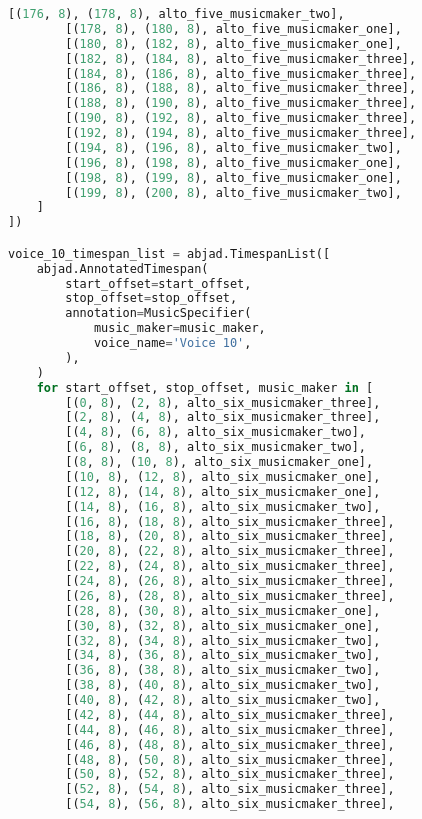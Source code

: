 \begin{lstlisting}[language=Python, caption=Invocation Source Code]
        [(176, 8), (178, 8), alto_five_musicmaker_two],
        [(178, 8), (180, 8), alto_five_musicmaker_one],
        [(180, 8), (182, 8), alto_five_musicmaker_one],
        [(182, 8), (184, 8), alto_five_musicmaker_three],
        [(184, 8), (186, 8), alto_five_musicmaker_three],
        [(186, 8), (188, 8), alto_five_musicmaker_three],
        [(188, 8), (190, 8), alto_five_musicmaker_three],
        [(190, 8), (192, 8), alto_five_musicmaker_three],
        [(192, 8), (194, 8), alto_five_musicmaker_three],
        [(194, 8), (196, 8), alto_five_musicmaker_two],
        [(196, 8), (198, 8), alto_five_musicmaker_one],
        [(198, 8), (199, 8), alto_five_musicmaker_one],
        [(199, 8), (200, 8), alto_five_musicmaker_two],
    ]
])

voice_10_timespan_list = abjad.TimespanList([
    abjad.AnnotatedTimespan(
        start_offset=start_offset,
        stop_offset=stop_offset,
        annotation=MusicSpecifier(
            music_maker=music_maker,
            voice_name='Voice 10',
        ),
    )
    for start_offset, stop_offset, music_maker in [
        [(0, 8), (2, 8), alto_six_musicmaker_three],
        [(2, 8), (4, 8), alto_six_musicmaker_three],
        [(4, 8), (6, 8), alto_six_musicmaker_two],
        [(6, 8), (8, 8), alto_six_musicmaker_two],
        [(8, 8), (10, 8), alto_six_musicmaker_one],
        [(10, 8), (12, 8), alto_six_musicmaker_one],
        [(12, 8), (14, 8), alto_six_musicmaker_one],
        [(14, 8), (16, 8), alto_six_musicmaker_two],
        [(16, 8), (18, 8), alto_six_musicmaker_three],
        [(18, 8), (20, 8), alto_six_musicmaker_three],
        [(20, 8), (22, 8), alto_six_musicmaker_three],
        [(22, 8), (24, 8), alto_six_musicmaker_three],
        [(24, 8), (26, 8), alto_six_musicmaker_three],
        [(26, 8), (28, 8), alto_six_musicmaker_three],
        [(28, 8), (30, 8), alto_six_musicmaker_one],
        [(30, 8), (32, 8), alto_six_musicmaker_one],
        [(32, 8), (34, 8), alto_six_musicmaker_two],
        [(34, 8), (36, 8), alto_six_musicmaker_two],
        [(36, 8), (38, 8), alto_six_musicmaker_two],
        [(38, 8), (40, 8), alto_six_musicmaker_two],
        [(40, 8), (42, 8), alto_six_musicmaker_two],
        [(42, 8), (44, 8), alto_six_musicmaker_three],
        [(44, 8), (46, 8), alto_six_musicmaker_three],
        [(46, 8), (48, 8), alto_six_musicmaker_three],
        [(48, 8), (50, 8), alto_six_musicmaker_three],
        [(50, 8), (52, 8), alto_six_musicmaker_three],
        [(52, 8), (54, 8), alto_six_musicmaker_three],
        [(54, 8), (56, 8), alto_six_musicmaker_three],

\end{lstlisting}
